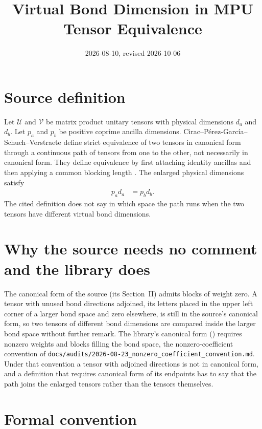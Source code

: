 \documentclass{article}
\title{Virtual Bond Dimension in MPU Tensor Equivalence}
\author{}
\date{2026-08-10, revised 2026-10-06}
\begin{document}
\maketitle
{}

\section{Source definition}

Let $\mathcal U$ and $\mathcal V$ be matrix product unitary tensors with
physical dimensions $d_a$ and $d_b$. Let $p_a$ and $p_b$ be positive coprime
ancilla dimensions. Cirac--P\'erez-Garc\'ia--Schuch--Verstraete define strict
equivalence of two tensors in canonical form through a continuous path of
tensors from one to the other, not necessarily in canonical form. They define
equivalence by first attaching identity ancillas and then applying a common
blocking length \cite[lines~706--724]{Cirac2017MPU}. The enlarged physical
dimensions satisfy
\begin{align}
    p_a d_a &= p_b d_b.
    \label{eq:mpu_equivalence_fixed_bond_physical_dimension_balance}
\end{align}
The cited definition does not say in which space the path runs when the two
tensors have different virtual bond dimensions.

\section{Why the source needs no comment and the library does}

The canonical form of the source (its Section~II) admits blocks of weight
zero. A tensor with unused bond directions adjoined, its letters placed in the
upper left corner of a larger bond space and zero elsewhere, is still in the
source's canonical form, so two tensors of different bond dimensions are
compared inside the larger bond space without further remark. The library's
canonical form () requires nonzero
weights and blocks filling the bond space, the nonzero-coefficient convention
of \texttt{docs/audits/2026-08-23\_nonzero\_coefficient\_convention.md}. Under
that convention a tensor with adjoined directions is not in canonical form,
and a definition that requires canonical form of its endpoints has to say that
the path joins the enlarged tensors rather than the tensors themselves.

\section{Formal convention}
\end{document}
